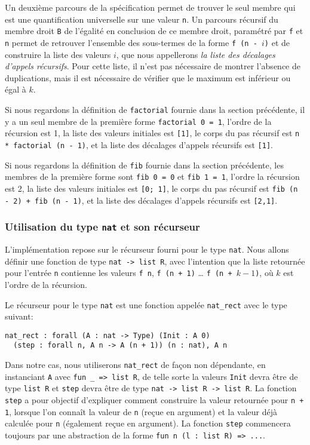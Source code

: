 \documentclass{modjflart}
\begin{document}
Un deuxième parcours de la spécification permet de trouver le seul
membre qui est une quantification universelle sur une valeur \texttt{n}.
Un parcours récursif du membre droit \texttt{B} de l'égalité en conclusion de
ce membre droit, paramétré par \texttt{f} et \texttt{n}  permet de retrouver
l'ensemble des sous-termes de la forme \texttt{f (n - \(i\))} et de
construire la liste des valeurs \(i\), que nous appellerons {\em la liste des
décalages d'appels récursifs}.  Pour cette liste, il n'est
pas nécessaire de montrer l'absence de duplications, mais il est
nécessaire de vérifier que le maximum est inférieur ou égal à \(k\).

Si nous regardons la définition de \texttt{factorial} fournie dans la
section précédente, il y a un seul membre de la première forme
\texttt{factorial 0 = 1}, l'ordre de la récursion est 1,
la liste des valeurs initiales est \texttt{[1]}, le
corps du pas récursif est \texttt{n * factorial (n - 1)}, et la liste
des décalages d'appels récursifs est \texttt{[1]}.

Si nous regardons la définition de \texttt{fib} fournie dans la section
précédente, les membres de la première forme sont \texttt{fib 0 = 0} et
\texttt{fib 1 = 1}, l'ordre la récursion est 2,
la liste des valeurs initiales est \texttt{[0; 1]},
le corps du pas récursif est \texttt{fib (n - 2) + fib (n - 1)}, et
la liste des décalages d'appels récursifs est \texttt{[2,1]}.

\subsubsection{Utilisation du type \texttt{nat} et son récurseur}
L'implémentation repose sur le récurseur fourni pour le type
\texttt{nat}.  Nous allons définir une fonction de type \texttt{nat -> list
  R}, avec l'intention que la liste retournée pour l'entrée \texttt{n}
contienne les valeurs \texttt{f n}, \texttt{f (n + 1)} \dots
\texttt{f (n + \(k - 1\))}, où \(k\) est l'ordre de la récursion.

Le récurseur pour le type \texttt{nat} est une fonction appelée
\texttt{nat\_rect} avec le type suivant:
\begin{verbatim}
nat_rect : forall (A : nat -> Type) (Init : A 0)
  (step : forall n, A n -> A (n + 1)) (n : nat), A n
\end{verbatim}
Dans notre cas, nous utiliserons \texttt{nat\_rect} de façon non
dépendante, en instanciant \texttt{A} avec \texttt{fun \_ => list R},
de telle sorte la
valeurs \texttt{Init} devra être de type \texttt{list R} et \texttt{step} devra
être de type \texttt{nat -> list R -> list R}.  La fonction \texttt{step} a
pour objectif d'expliquer comment construire la valeur retournée pour
\texttt{n + 1}, lorsque l'on connaît la valeur de \texttt{n} (reçue en argument)
et la valeur déjà calculée pour \texttt{n} (également reçue en
argument).
La fonction \texttt{step} commencera
toujours par une abstraction de la forme \texttt{fun n (l : list R) => ...}.
\end{document}
